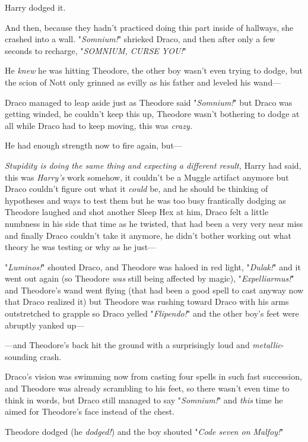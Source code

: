 Harry dodged it.

And then, because they hadn't practiced doing this part inside of hallways, she
crashed into a wall.
\sbreak
"\emph{Somnium!}" shrieked Draco, and then after only a few seconds to
recharge, "\emph{SOMNIUM, CURSE YOU!}"

He \emph{knew} he was hitting Theodore, the other boy wasn't even trying to
dodge, but the scion of Nott only grinned as evilly as his father and leveled
his wand---

Draco managed to leap aside just as Theodore said "\emph{Somnium!}" but Draco
was getting winded, he couldn't keep this up, Theodore wasn't bothering to
dodge at all while Draco had to keep moving, this was \emph{crazy.}

He had enough strength now to fire again, but---

\emph{Stupidity is doing the same thing and expecting a different result,}
Harry had said, this was \emph{Harry's} work somehow, it couldn't be a Muggle
artifact anymore but Draco couldn't figure out what it \emph{could} be, and he
should be thinking of hypotheses and ways to test them but he was too busy
frantically dodging as Theodore laughed and shot another Sleep Hex at him,
Draco felt a little numbness in his side that time as he twisted, that had been
a very very near miss and finally Draco couldn't take it anymore, he didn't
bother working out what theory he was testing or why as he just---

"\emph{Luminos!}" shouted Draco, and Theodore was haloed in red light,
"\emph{Dulak!}" and it went out again (so Theodore \emph{was} still being
affected by magic), "\emph{Expelliarmus!}" and Theodore's wand went flying
(that had been a good spell to cast anyway now that Draco realized it) but
Theodore was rushing toward Draco with his arms outstretched to grapple so
Draco yelled "\emph{Flipendo!}" and the other boy's feet were abruptly yanked
up---

---and Theodore's back hit the ground with a surprisingly loud and
\emph{metallic}-sounding crash.

Draco's vision was swimming now from casting four spells in such fast
succession, and Theodore was already scrambling to his feet, so there wasn't
even time to think in words, but Draco still managed to say "\emph{Somnium!}"
and \emph{this} time he aimed for Theodore's face instead of the chest.

Theodore dodged (he \emph{dodged!}) and the boy shouted "\emph{Code seven on
Malfoy!}"

